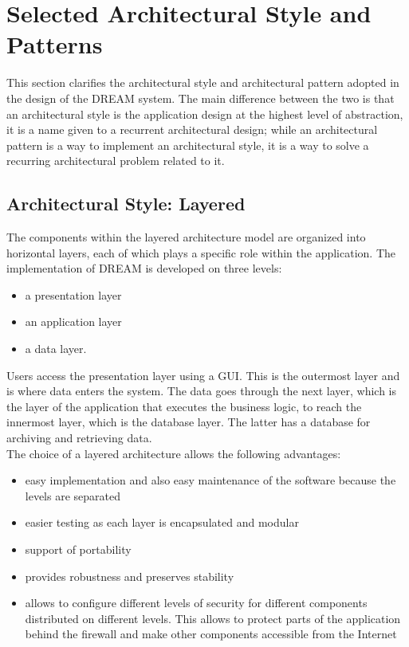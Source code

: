 \section{Selected Architectural Style and Patterns}
This section clarifies the architectural style and architectural pattern adopted in the design of the DREAM system.
The main difference between the two is that an architectural style is the application design at the highest level of abstraction, it is a name given to a recurrent architectural design; while an architectural pattern is a way to implement an architectural style, it is a way to solve a recurring architectural problem related to it.

\subsection{Architectural Style: Layered}
The components within the layered architecture model are organized into horizontal layers, each of which plays a specific role within the application.
The implementation of DREAM is developed on three levels: 
\begin{itemize}
    \item a presentation layer
    \item an application layer 
    \item a data layer. 
\end{itemize}

Users access the presentation layer using a GUI. This is the outermost layer and is where data enters the system.
The data goes through the next layer, which is the layer of the application that executes the business logic, to reach the innermost layer, which is the database layer. The latter has a database for archiving and retrieving data.\\
The choice of a layered architecture allows the following advantages:
\begin{itemize}
    \item easy implementation and also easy maintenance of the software because the levels are separated
    \item easier testing as each layer is encapsulated and modular
    \item support of portability
    \item provides robustness and preserves stability
    \item allows to configure different levels of security for different components distributed on different levels. This allows to protect parts of the application behind the firewall and make other components accessible from the Internet
\end{itemize}


